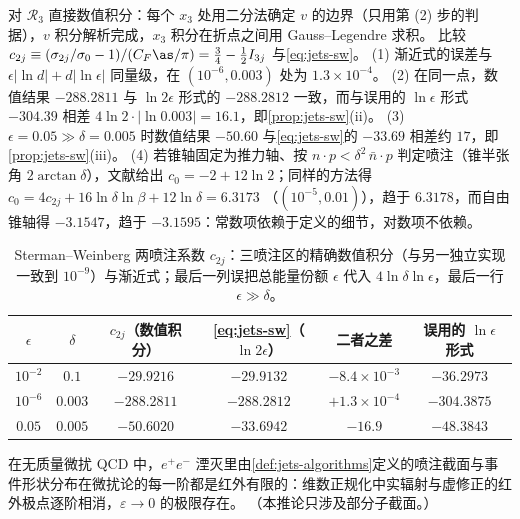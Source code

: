 \begin{example}\label{ex:jets-sw}
对 $\mathcal R_3$ 直接数值积分：每个 $x_3$ 处用二分法确定 $v$ 的边界（只用第 (2) 步的判据），$v$ 积分解析完成，$x_3$ 积分在折点之间用 Gauss--Legendre 求积。
比较 $c_{2j}\equiv(\sigma_{2j}/\sigma_0-1)/(C_F\as/\pi)=\frac34-\frac12I_{3j}$ 与\cref{eq:jets-sw}。
(1) 渐近式的误差与 $\epsilon|\ln d|+d|\ln\epsilon|$ 同量级，在 $(10^{-6},0.003)$ 处为 $1.3\times10^{-4}$。
(2) 在同一点，数值结果 $-288.2811$ 与 $\ln2\epsilon$ 形式的 $-288.2812$ 一致，而与误用的 $\ln\epsilon$ 形式 $-304.39$ 相差 $4\ln2\cdot|\ln0.003|=16.1$，即\cref{prop:jets-sw}(ii)。
(3) $\epsilon=0.05\gg\delta=0.005$ 时数值结果 $-50.60$ 与\cref{eq:jets-sw}的 $-33.69$ 相差约 $17$，即\cref{prop:jets-sw}(iii)。
(4) 若锥轴固定为推力轴、按 $n\cdot p<\delta^2\,\bar n\cdot p$ 判定喷注（锥半张角 $2\arctan\delta$），文献给出 $c_0=-2+12\ln2$\cite{Becher:2015hka}；同样的方法得 $c_0=4c_{2j}+16\ln\delta\ln\beta+12\ln\delta=6.3173$
（$(10^{-5},0.01)$），趋于 $6.3178$，而自由锥轴得 $-3.1547$，趋于 $-3.1595$：常数项依赖于定义的细节，对数项不依赖。
\end{example}

\begin{table}[htbp]
\centering
\small
\renewcommand{\arraystretch}{1.0}
\begin{tabular}{@{}cccccc@{}}
\toprule
$\epsilon$ & $\delta$ & $c_{2j}$（数值积分） & \cref{eq:jets-sw}（$\ln2\epsilon$） & 二者之差 & 误用的 $\ln\epsilon$ 形式 \\
\midrule
$10^{-2}$ & $0.1$   & $-29.9216$  & $-29.9132$  & $-8.4\times10^{-3}$ & $-36.2973$ \\
$10^{-6}$ & $0.003$ & $-288.2811$ & $-288.2812$ & $+1.3\times10^{-4}$ & $-304.3875$ \\
\midrule
$0.05$    & $0.005$ & $-50.6020$  & $-33.6942$  & $-16.9$             & $-48.3843$ \\
\bottomrule
\end{tabular}
\caption{Sterman--Weinberg 两喷注系数 $c_{2j}$：三喷注区的精确数值积分（与另一独立实现一致到 $10^{-9}$）与渐近式；最后一列误把总能量份额 $\epsilon$ 代入 $4\ln\delta\ln\epsilon$，最后一行 $\epsilon\gg\delta$。}
\label{tab:jets-sw-numerics}
\end{table}

\begin{corollary}\label{cor:jets-ir-finite}
在无质量微扰 QCD 中，$e^+e^-$ 湮灭里由\cref{def:jets-algorithms}定义的喷注截面与事件形状分布在微扰论的每一阶都是红外有限的：维数正规化中实辐射与虚修正的红外极点逐阶相消，$\varepsilon\to0$ 的极限存在。
（本推论只涉及部分子截面。）
\end{corollary}

